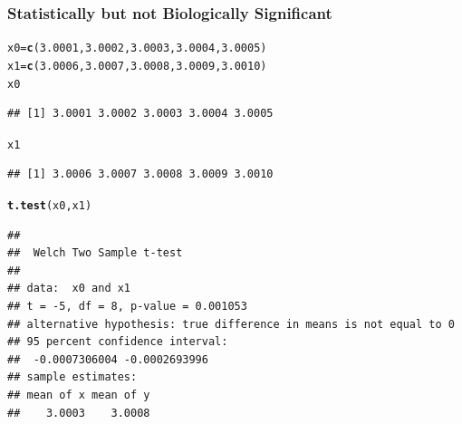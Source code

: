 \documentclass[xcolor=x11names,compress]{beamer}\usepackage[]{graphicx}\usepackage[]{color}
\makeatletter
\newcommand{\hlnum}[1]{\textcolor[rgb]{0.686,0.059,0.569}{#1}}%
\newcommand{\hlstd}[1]{\textcolor[rgb]{0.345,0.345,0.345}{#1}}%
\newcommand{\hlkwb}[1]{\textcolor[rgb]{0.69,0.353,0.396}{#1}}%
\newcommand{\hlkwd}[1]{\textcolor[rgb]{0.737,0.353,0.396}{\textbf{#1}}}%
\newenvironment{kframe}{%
 \def\at@end@of@kframe{}%
 \ifinner\ifhmode%
  \def\at@end@of@kframe{\end{minipage}}%
  \begin{minipage}{\columnwidth}%
 \fi\fi%
 \def\FrameCommand##1{\hskip\@totalleftmargin \hskip-\fboxsep
 \colorbox{shadecolor}{##1}\hskip-\fboxsep
     \hskip-\linewidth \hskip-\@totalleftmargin \hskip\columnwidth}%
 \MakeFramed {\advance\hsize-\width
   \@totalleftmargin\z@ \linewidth\hsize
   \@setminipage}}%
 {\par\unskip\endMakeFramed%
 \at@end@of@kframe}
\newenvironment{knitrout}{}{} %
\makeatother
\begin{document}
\begin{frame}[containsverbatim]
  \frametitle{Statistically but not Biologically Significant}
\begin{small}
\begin{knitrout}\tiny
{}\color{fgcolor}\begin{kframe}
\begin{alltt}
\hlstd{x0}\hlkwb{=}\hlkwd{c}\hlstd{(}\hlnum{3.0001}\hlstd{,}\hlnum{3.0002}\hlstd{,}\hlnum{3.0003}\hlstd{,}\hlnum{3.0004}\hlstd{,}\hlnum{3.0005}\hlstd{)}
\hlstd{x1}\hlkwb{=}\hlkwd{c}\hlstd{(}\hlnum{3.0006}\hlstd{,}\hlnum{3.0007}\hlstd{,}\hlnum{3.0008}\hlstd{,}\hlnum{3.0009}\hlstd{,}\hlnum{3.0010}\hlstd{)}
\hlstd{x0}
\end{alltt}
\begin{verbatim}
## [1] 3.0001 3.0002 3.0003 3.0004 3.0005
\end{verbatim}
\begin{alltt}
\hlstd{x1}
\end{alltt}
\begin{verbatim}
## [1] 3.0006 3.0007 3.0008 3.0009 3.0010
\end{verbatim}
\begin{alltt}
\hlkwd{t.test}\hlstd{(x0,x1)}
\end{alltt}
\begin{verbatim}
## 
## 	Welch Two Sample t-test
## 
## data:  x0 and x1
## t = -5, df = 8, p-value = 0.001053
## alternative hypothesis: true difference in means is not equal to 0
## 95 percent confidence interval:
##  -0.0007306004 -0.0002693996
## sample estimates:
## mean of x mean of y 
##    3.0003    3.0008
\end{verbatim}
\end{kframe}
\end{knitrout}
\end{small}
\end{frame}
\end{document}
